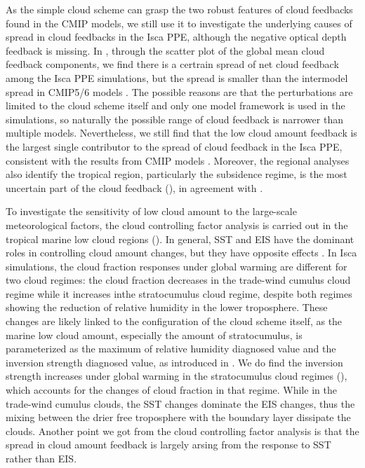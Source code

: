 As the simple cloud scheme can grasp the two robust features of cloud feedbacks found in the CMIP models, we still use it to investigate the underlying causes of spread in cloud feedbacks in the Isca PPE, although the negative optical depth feedback is missing. In , through the scatter plot of the global mean cloud feedback components, we find there is a certrain spread of net cloud feedback among the Isca PPE simulations, but the spread is smaller than the intermodel spread in CMIP5/6 models \citep{Ceppi2017,Zelinka2020causes}. The possible reasons are that the perturbations are limited to the cloud scheme itself and only one model framework is used in the simulations, so naturally the possible range of cloud feedback is narrower than multiple models. Nevertheless, we still find that the low cloud amount feedback is the largest single contributor to the spread of cloud feedback in the Isca PPE, consistent with the results from CMIP models \citep{Zelinka2016insights}. Moreover, the regional analyses also identify the tropical region, particularly the subsidence regime, is the most uncertain part of the cloud feedback (), in agreement with \cite{Bony2005}.

To investigate the sensitivity of low cloud amount to the large-scale meteorological factors, the cloud controlling factor analysis is carried out in the tropical marine low cloud regions (). In general, SST and EIS have the dominant roles in controlling cloud amount changes, but they have opposite effects \citep[e.g.,][]{Qu2014,Qu2015positive,Klein2017low,Scott2020,Cesana2021}. In Isca simulations, the cloud fraction responses under global warming are different for two cloud regimes: the cloud fraction decreases in the trade-wind cumulus cloud regime while it increases inthe stratocumulus cloud regime, despite both regimes showing the reduction of relative humidity in the lower troposphere. These changes are likely linked to the configuration of the cloud scheme itself, as the marine low cloud amount, especially the amount of stratocumulus, is parameterized as the maximum of relative humidity diagnosed value and the inversion strength diagnosed value, as introduced in . We do find the inversion strength increases under global warming in the stratocumulus cloud regimes (), which accounts for the changes of cloud fraction in that regime. While in the trade-wind cumulus clouds, the SST changes dominate the EIS changes, thus the mixing between the drier free troposphere with the boundary layer dissipate the clouds. Another point we got from the cloud controlling factor analysis is that the spread in cloud amount feedback is largely arsing from the response to SST rather than EIS.

